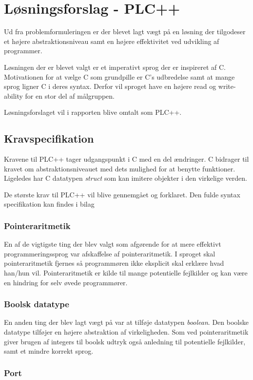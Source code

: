 \section{Løsningsforslag - PLC++}
Ud fra problemformuleringen er der blevet lagt vægt på en løsning der tilgodeser et højere abstraktionsniveau samt en højere effektivitet ved udvikling af programmer.

Løsningen der er blevet valgt er et imperativt sprog der er inspireret af C. Motivationen for at vælge C som grundpille er C's udbredelse samt at mange sprog ligner C i deres syntax. Derfor vil sproget have en højere read og write-ability for en stor del af målgruppen.

Løsningsforslaget vil i rapporten blive omtalt som PLC++.

\subsection{Kravspecifikation}
Kravene til PLC++ tager udgangspunkt i C med en del ændringer. C bidrager til kravet om abstraktionsniveauet med dets mulighed for at benytte funktioner. Ligeledes har C datatypen \textit{struct} som kan imitere objekter i den virkelige verden.

De største krav til PLC++ vil blive gennemgået og forklaret. Den fulde syntax specifikation kan findes i bilag 


\subsubsection{Pointeraritmetik}
En af de vigtigste ting der blev valgt som afgørende for at mere effektivt programmeringssprog var afskaffelse af pointeraritmetik. I sproget skal pointeraritmetik fjernes så programmøren ikke eksplicit skal erklære hvad han/hun vil. Pointeraritmetik er kilde til mange potentielle fejlkilder og kan være en hindring for selv øvede programmører.

\subsubsection{Boolsk datatype}
En anden ting der blev lagt vægt på var at tilføje datatypen \textit{boolean}. Den boolske datatype tilføjer en højere abstraktion af virkeligheden. Som ved pointeraritmetik giver brugen af integers til boolsk udtryk også anledning til potentielle fejlkilder, samt et mindre korrekt sprog.

\subsubsection{Port}
